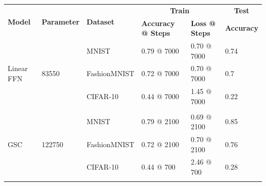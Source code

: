 \documentclass{article}
\begin{document}
\begin{table}[H]
\centering
\begin{tabular}{llllll}
\hline
\multirow{2}{*}{\textbf{Model}}   & \multirow{2}{*}{\textbf{Parameter}} & \multirow{2}{*}{\textbf{Dataset}} & \multicolumn{2}{c}{\textbf{Train}}                & \multicolumn{1}{c}{\textbf{Test}} \\ \cline{4-6} 
                                  &                                     &                                   & \textbf{Accuracy @ Steps} & \textbf{Loss @ Steps} & \textbf{Accuracy}                 \\ \cline{1-3}
\multirow{3}{*}{Linear FFN}       & \multirow{3}{*}{83550}              & MNIST                             & 0.79 @ 7000               & 0.70 @ 7000           & 0.74                              \\
                                  &                                     & FashionMNIST                      & 0.72 @ 7000               & 0.70 @ 7000           & 0.7                               \\
                                  &                                     & CIFAR-10                          & 0.44 @ 7000               & 1.45 @ 7000           & 0.22                              \\
                                  &                                     &                                   &                           &                       &                                   \\
\multirow{3}{*}{GSC}              & \multirow{3}{*}{122750}             & MNIST                             & 0.79 @ 2100               & 0.69 @ 2100           & 0.85                              \\
                                  &                                     & FashionMNIST                      & 0.72 @ 2100               & 0.70 @ 2100           & 0.76                              \\
                                  &                                     & CIFAR-10                          & 0.44 @ 700                & 2.46 @ 700            & 0.28                              \\
                                  &                                     &                                   &                           &                       &                                   \\

\end{tabular}
\end{table}
\end{document}
